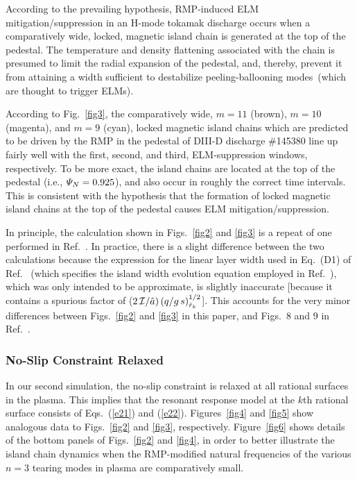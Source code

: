 \documentclass[12pt,prb,aps]{revtex4-1}
\begin{document}
According to the prevailing hypothesis, RMP-induced ELM mitigation/suppression in an H-mode tokamak discharge occurs when a comparatively wide, locked, magnetic
island chain is generated at the top of the pedestal.\cite{hu} The temperature and density flattening associated with the chain
is presumed to limit the radial expansion of the
pedestal, and, thereby, prevent it from attaining a width sufficient to destabilize peeling-ballooning modes\,\cite{connor}  (which are thought to trigger ELMs).\cite{d3d}

According to Fig.~\ref{fig3},  
 the comparatively wide, $m=11$ (brown),  $m=10$ (magenta), and  $m=9$ (cyan), locked magnetic island chains which are predicted to be driven by the RMP in the pedestal of DIII-D discharge \#145380 line up
fairly well with the first, second, and third, ELM-suppression windows, respectively. To be more exact, the island chains are located at
the top of the pedestal (i.e., ${\mit\Psi}_N=0.925$), and also occur in roughly the correct time intervals. This is consistent with the hypothesis that the formation of locked
magnetic island chains at the top of the pedestal causes ELM mitigation/suppression. 

In principle, the calculation shown in Figs.~\ref{fig2} and \ref{fig3} is a repeat of one performed in Ref.~. In practice, there is a slight difference between
the two calculations because the expression for the linear layer width used in Eq.~(D1) of Ref.~ (which specifies the island width evolution
equation employed in Ref.~), which was only intended to be approximate,  is slightly inaccurate [because it contains a spurious factor of ($2\,{\cal I}/\hat{a})\,(q/g\,s)^{1/2}_{\hat{r}_k}$]. This accounts for the very minor differences between Figs.~\ref{fig2} and \ref{fig3} in this
paper, and Figs.~8 and 9 in Ref.~. 

\subsubsection{No-Slip Constraint Relaxed}
In our second simulation, the no-slip constraint is relaxed at all rational surfaces in the plasma. This implies that the resonant response
model at the $k$th rational surface consists of Eqs.~(\ref{e21}) and (\ref{e22}). Figures~\ref{fig4} and \ref{fig5} show analogous 
data to Figs.~\ref{fig2} and \ref{fig3}, respectively. Figure~\ref{fig6} shows details of the bottom panels of Figs.~\ref{fig2} and \ref{fig4},
in order to better illustrate the island chain dynamics when the  RMP-modified natural frequencies of the various $n=3$ tearing modes in  plasma
are comparatively small. 
\end{document}
